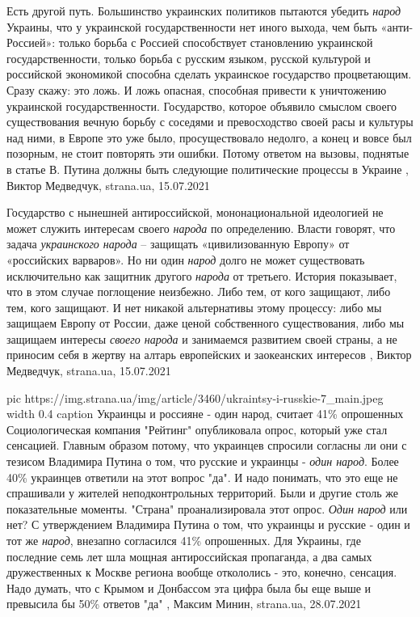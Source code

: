 Есть другой путь.  Большинство украинских политиков пытаются убедить
\emph{народ} Украины, что у украинской государственности нет иного выхода, чем
быть «анти-Россией»: только борьба с Россией способствует становлению
украинской государственности, только борьба с русским языком, русской культурой
и российской экономикой способна сделать украинское государство процветающим.
Сразу скажу: это ложь. И ложь опасная, способная привести к уничтожению
украинской государственности. Государство, которое объявило смыслом своего
существования вечную борьбу с соседями и превосходство своей расы и культуры
над ними, в Европе это уже было, просуществовало недолго, а конец и вовсе был
позорным, не стоит повторять эти ошибки.  Потому ответом на вызовы, поднятые в
статье В. Путина должны быть следующие политические процессы в Украине
, 
Виктор Медведчук, strana.ua, 15.07.2021

Государство с нынешней антироссийской, мононациональной идеологией не может
служить интересам своего \emph{народа} по определению. Власти говорят, что задача
\emph{украинского народа} – защищать «цивилизованную Европу» от «российских варваров».
Но ни один \emph{народ} долго не может существовать исключительно как защитник другого
\emph{народа} от третьего. История показывает, что в этом случае поглощение неизбежно.
Либо тем, от кого защищают, либо тем, кого защищают. И нет никакой альтернативы
этому процессу: либо мы защищаем Европу от России, даже ценой собственного
существования, либо мы защищаем интересы \emph{своего народа} и занимаемся развитием
своей страны, а не приносим себя в жертву на алтарь европейских и заокеанских
интересов
, 
Виктор Медведчук, strana.ua, 15.07.2021

\ifcmt
  pic https://img.strana.ua/img/article/3460/ukraintsy-i-russkie-7_main.jpeg
  width 0.4
	caption Украинцы и россияне - один народ, считает 41\% опрошенных 
\fi
Социологическая компания "Рейтинг" опубликовала опрос, который уже стал
сенсацией. Главным образом потому, что украинцев спросили согласны ли они с
тезисом Владимира Путина о том, что русские и украинцы - \emph{один народ}.  Более 40\%
украинцев ответили на этот вопрос "да". И надо понимать, что это еще не
спрашивали у жителей неподконтрольных территорий.  Были и другие столь же
показательные моменты.  "Страна" проанализировала этот опрос.  \emph{Один народ} или
нет?  С утверждением Владимира Путина о том, что украинцы и русские - один и
тот же \emph{народ}, внезапно согласился 41\% опрошенных.  Для Украины, где последние
семь лет шла мощная антироссийская пропаганда, а два самых дружественных к
Москве региона вообще откололись - это, конечно, сенсация.  Надо думать, что с
Крымом и Донбассом эта цифра была бы еще выше и превысила бы 50\% ответов "да"
, 
Максим Минин, strana.ua, 28.07.2021
